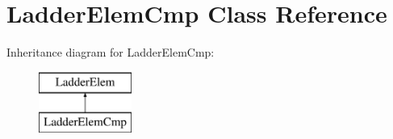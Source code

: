 \hypertarget{class_ladder_elem_cmp}{\section{Ladder\-Elem\-Cmp Class Reference}
\label{class_ladder_elem_cmp}
}
Inheritance diagram for Ladder\-Elem\-Cmp\-:\begin{figure}[H]
\begin{center}
\leavevmode
\includegraphics[height=2.000000cm]{class_ladder_elem_cmp}
\end{center}
\end{figure}
